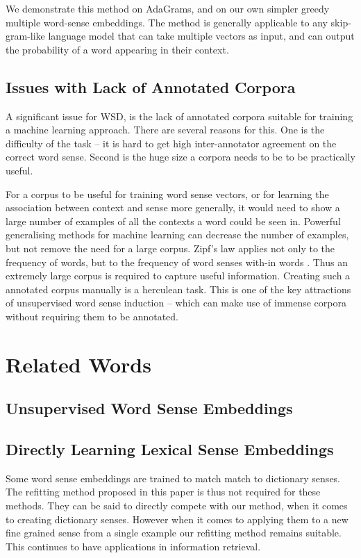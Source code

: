\documentclass{sig-alternate}
\begin{document}
We demonstrate this method on AdaGrams\parencite{AdaGrams}, and on our own simpler greedy multiple word-sense embeddings. The method is generally applicable to any skip-gram-like language model that can take multiple vectors as input, and can output the probability of a word appearing in their context.

\subsection{Issues with Lack of Annotated Corpora} \label{corpussize}
A significant issue for WSD, is the lack of annotated corpora suitable for training a machine learning approach.
There are several reasons for this. One is the difficulty of the task -- it is hard to get high inter-annotator agreement on the correct word sense. Second is the huge size a corpora needs to be to be practically useful.

For a corpus to be useful for training word sense vectors, or for learning the association between context and sense more generally, it would need to show a large number of examples of all the contexts a word could be seen in. Powerful generalising methods for machine learning can decrease the number of examples, but not remove the need for a large corpus. 
Zipf's law \parencite{zipf1949human} applies not only to the frequency of words, but to the frequency of word senses with-in words \parencite{gilmour2005understanding}. Thus an extremely large corpus is required to capture useful information. Creating such a annotated corpus manually is a herculean task. This is one of the key attractions of unsupervised word sense induction -- which can make use of immense corpora without requiring them to be annotated.


\section{Related Words}

\subsection{Unsupervised Word Sense Embeddings}


\subsection{Directly Learning Lexical Sense Embeddings}
Some word sense embeddings are trained to match match to dictionary senses. The refitting method proposed in this paper is thus not required for these methods.
They can be said to directly compete with our method, when it comes to creating dictionary senses. However when it comes to applying them to a new fine grained sense from a single example our refitting method remains suitable. This continues to have applications in information retrieval.
\end{document}
